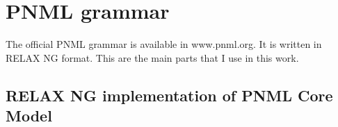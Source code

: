 
\chapter{PNML grammar} %

\label{AppendixA} %


The official PNML grammar is available in www.pnml.org. It is written in
RELAX NG format. This are the main parts that I use in this work.

\section{RELAX NG implementation of PNML Core Model}

